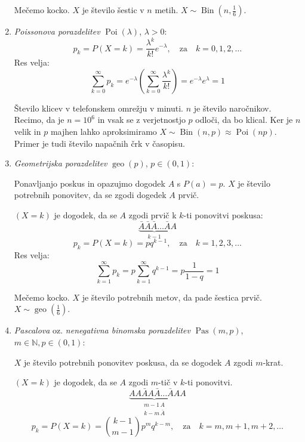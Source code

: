 \documentclass[12pt]{book}
\theoremstyle{definition}
\theoremstyle{plain}
\theoremstyle{plain}
\theoremstyle{plain}
\theoremstyle{remark}
\begin{document}
\begin{enumerate}
    \begin{zgled}
        Mečemo kocko. $X$ je število šestic v $n$ metih. $X \sim \operatorname{Bin}(n, \frac{1}{6})$.
    \end{zgled}
    \item \emph{Poissonova porazdelitev} $\operatorname{Poi}(\lambda)$, $\lambda > 0$:
    $$
    p_k=P(X=k)=\frac{\lambda^k}{k !} e^{-\lambda}, \quad \text{za} \quad k=0,1,2, \ldots
    $$
    Res velja: 
    $$
    \sum_{k=0}^{\infty} p_k=e^{-\lambda} \left(\sum_{k=0}^{\infty} \frac{\lambda^k}{k !}\right)=e^{-\lambda} e^\lambda=1
    $$
    \begin{zgled}
        Število klicev v telefonskem omrežju v minuti. $n$ je število naročnikov. Recimo, da je $n=10^6$ in vsak se z verjetnostjo $p$ odloči, da bo klical. Ker je $n$ velik in $p$ majhen lahko aproksimiramo $X \sim \operatorname{Bin}(n,p)\approx \operatorname{Poi}(np)$. Primer je tudi število napačnih črk v časopisu. 
    \end{zgled}
    \item \emph{Geometrijska porazdelitev} $\operatorname{geo}(p)$, $p \in (0,1)$:
    
    Ponavljanjo poskus in opazujmo dogodek $A$ s $P(a) = p$. $X$ je število potrebnih ponovitev, da se zgodi dogedek $A$ prvič. 

    $(X=k)$ je dogodek, da se $A$ zgodi prvič k $k$-ti ponovitvi poskusa:
    $$
    \underbrace{\bar A\bar A\bar A \ldots \bar A}_{k-1}A
    $$
    $$
    p_k=P(X=k)=p  q^{k-1}, \quad \text{za} \quad k=1, 2, 3, \ldots
    $$
    Res velja: 
    $$
    \sum_{k=1}^{\infty} p_k=p \sum_{k=1}^{\infty} q^{k-1}=p \frac{1}{1-q}=1
    $$
    \begin{zgled}
        Mečemo kocko. $X$ je število potrebnih metov, da pade šestica prvič. $X \sim \operatorname{geo}(\frac{1}{6})$.
    \end{zgled}
    \item \emph{Pascalova} oz. \emph{nenegativna binomska porazdelitev} $\operatorname{Pas}(m,p)$, $m \in \mathbb{N}, p \in (0,1)$:
    
    $X$ je število potrebnih ponovitev poskusa, da se dogodek $A$ zgodi $m$-krat.

    $(X=k)$ je dogodek, da se $A$ zgodi $m$-tič v $k$-ti ponovitvi.
    $$
    \underbrace{A A \bar A A \bar A \ldots \bar A A}_{\substack{m-1 \, A \\ k-m \, \bar A}}A
    $$
    $$
    p_k=P(X=k)=\binom{k-1}{m-1} p^m q^{k-m}, \quad \text{za} \quad k=m, m+1, m+2, \ldots
    $$


\end{enumerate}
\end{document}
